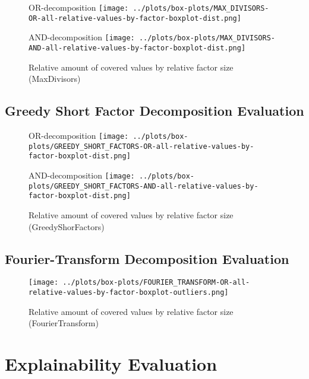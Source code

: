 \begin{figure}[t]
	\begin{minipage}[h]{0.49\linewidth}
		\centering
		OR-decomposition
		\texttt{[image: ../plots/box-plots/MAX\_DIVISORS-OR-all-relative-values-by-factor-boxplot-dist.png]}
	\end{minipage}
	\begin{minipage}[h]{0.49\linewidth}
		\centering
		AND-decomposition
		\texttt{[image: ../plots/box-plots/MAX\_DIVISORS-AND-all-relative-values-by-factor-boxplot-dist.png]}
	\end{minipage}
	\caption{Relative amount of covered values by relative factor size (MaxDivisors)}
	\label{fig:max-divisor-all-factors-box-plot}
\end{figure}

\subsection{Greedy Short Factor Decomposition Evaluation}

\begin{figure}[b]
	\begin{minipage}[h]{0.49\linewidth}
		\centering
		OR-decomposition
		\texttt{[image: ../plots/box-plots/GREEDY\_SHORT\_FACTORS-OR-all-relative-values-by-factor-boxplot-dist.png]}
	\end{minipage}
	\begin{minipage}[h]{0.49\linewidth}
		\centering
		AND-decomposition
		\texttt{[image: ../plots/box-plots/GREEDY\_SHORT\_FACTORS-AND-all-relative-values-by-factor-boxplot-dist.png]}
	\end{minipage}
	\caption{Relative amount of covered values by relative factor size (GreedyShorFactors)}
	\label{fig:greedy-short-factors-all-factors-box-plot}
\end{figure}

\subsection{Fourier-Transform Decomposition Evaluation}

\begin{figure}[h]
	\texttt{[image: ../plots/box-plots/FOURIER\_TRANSFORM-OR-all-relative-values-by-factor-boxplot-outliers.png]}
	\caption{Relative amount of covered values by relative factor size (FourierTransform)}
	\label{fig:fourier-all-factors-box-plot}
\end{figure}

\section{Explainability Evaluation}


